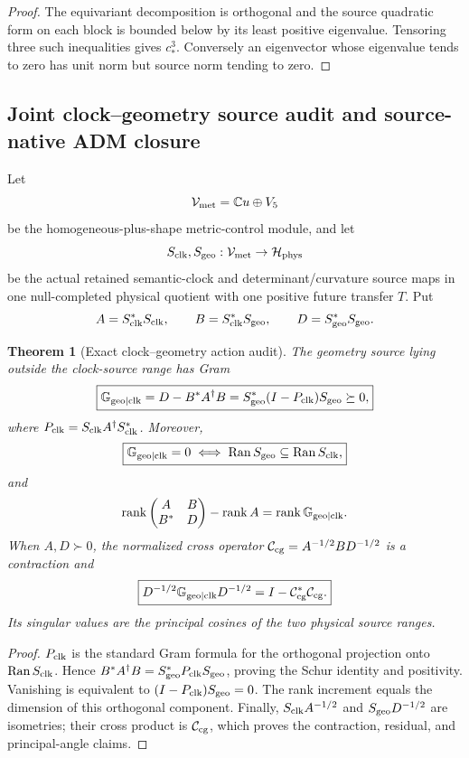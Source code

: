 \documentclass[11pt]{article}
\newtheorem{theorem}{Theorem}[section]
\theoremstyle{definition}
\theoremstyle{remark}
\newcommand{\C}{\mathbb C}
\newcommand{\rank}{\operatorname{rank}}
\newcommand{\Ran}{\operatorname{Ran}}
\begin{document}
\begin{proof}
The equivariant decomposition is orthogonal and the source quadratic form on
each block is bounded below by its least positive eigenvalue.  Tensoring three
such inequalities gives $c_*^3$.  Conversely an eigenvector whose eigenvalue
tends to zero has unit norm but source norm tending to zero.
\end{proof}

\subsection{Joint clock--geometry source audit and source-native ADM closure}

Let
\[
 \mathcal V_{\rm met}=\C u\oplus V_5
\]
be the homogeneous-plus-shape metric-control module, and let
\[
 S_{\rm clk},S_{\rm geo}:\mathcal V_{\rm met}\to\mathcal H_{\rm phys}
\]
be the actual retained semantic-clock and determinant/curvature source maps in
one null-completed physical quotient with one positive future transfer $T$.
Put
\[
 A=S_{\rm clk}^*S_{\rm clk},\qquad
 B=S_{\rm clk}^*S_{\rm geo},\qquad
 D=S_{\rm geo}^*S_{\rm geo}.
\]

\begin{theorem}[Exact clock--geometry action audit]
\label{thm:ADM-action-audit-master}
The geometry source lying outside the clock-source range has Gram
\[
 \boxed{
 \mathbb G_{{\rm geo}\mid{\rm clk}}
 =D-B^*A^\dagger B
 =S_{\rm geo}^*(I-P_{\rm clk})S_{\rm geo}\succeq0,}
\]
where $P_{\rm clk}=S_{\rm clk}A^\dagger S_{\rm clk}^*$.  Moreover,
\[
 \boxed{
 \mathbb G_{{\rm geo}\mid{\rm clk}}=0
 \iff
 \Ran S_{\rm geo}\subseteq\Ran S_{\rm clk},}
\]
and
\[
 \rank\begin{pmatrix}A&B\\B^*&D\end{pmatrix}-\rank A
 =\rank\mathbb G_{{\rm geo}\mid{\rm clk}}.
\]
When $A,D\succ0$, the normalized cross operator
$\mathcal C_{\rm cg}=A^{-1/2}BD^{-1/2}$ is a contraction and
\[
 \boxed{
 D^{-1/2}\mathbb G_{{\rm geo}\mid{\rm clk}}D^{-1/2}
 =I-\mathcal C_{\rm cg}^*\mathcal C_{\rm cg}.}
\]
Its singular values are the principal cosines of the two physical source
ranges.
\end{theorem}

\begin{proof}
$P_{\rm clk}$ is the standard Gram formula for the orthogonal projection onto
$\Ran S_{\rm clk}$.  Hence
$B^*A^\dagger B=S_{\rm geo}^*P_{\rm clk}S_{\rm geo}$, proving the Schur
identity and positivity.  Vanishing is equivalent to
$(I-P_{\rm clk})S_{\rm geo}=0$.  The rank increment equals the dimension of
this orthogonal component.  Finally,
$S_{\rm clk}A^{-1/2}$ and $S_{\rm geo}D^{-1/2}$ are isometries; their cross
product is $\mathcal C_{\rm cg}$, which proves the contraction, residual, and
principal-angle claims.
\end{proof}
\end{document}
